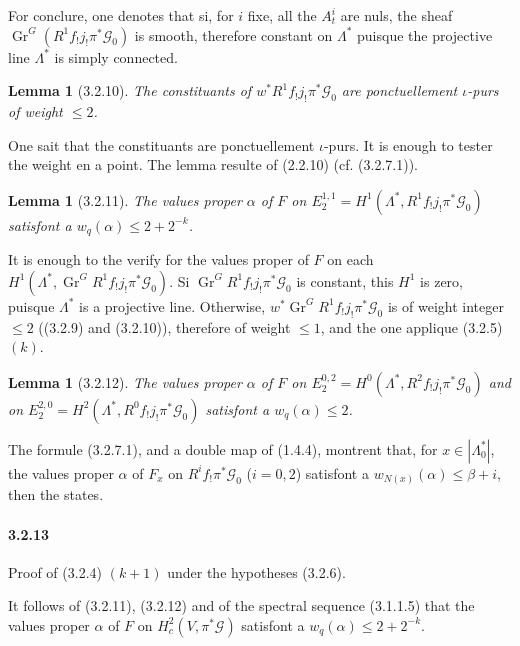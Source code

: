 \documentclass[12pt,a4paper]{article}
\theoremstyle{plain}
\newtheorem{lemma}[theorem]{Lemma}
\theoremstyle{definition}
\theoremstyle{remark}
\DeclareMathOperator{\Gr}{Gr}
\begin{document}
For conclure, one denotes that si, for $i$ fixe, all the $A_t^i$ are nuls, the sheaf $\Gr^G(R^1 f_! j_! \pi^* \mathscr{G}_0)$ is smooth, therefore constant on $\Lambda^*$ puisque the projective line $\Lambda^*$ is simply connected.

\begin{lemma}[3.2.10]
The constituants of $w^* R^1 f_! j_! \pi^* \mathscr{G}_0$ are ponctuellement $\iota$-purs of weight $\leq 2$.
\end{lemma}

One sait that the constituants are ponctuellement $\iota$-purs. It is enough to tester the weight en a point. The lemma resulte of (2.2.10) (cf. (3.2.7.1)).

\begin{lemma}[3.2.11]
The values proper $\alpha$ of $F$ on $E_2^{1,1} = H^1(\Lambda^*, R^1 f_! j_! \pi^* \mathscr{G}_0)$ satisfont a $w_q(\alpha) \leq 2 + 2^{-k}$.
\end{lemma}

It is enough to the verify for the values proper of $F$ on each $H^1(\Lambda^*, \Gr^G R^1 f_! j_! \pi^* \mathscr{G}_0)$. Si $\Gr^G R^1 f_! j_! \pi^* \mathscr{G}_0$ is constant, this $H^1$ is zero, puisque $\Lambda^*$ is a projective line. Otherwise, $w^* \Gr^G R^1 f_! j_! \pi^* \mathscr{G}_0$ is of weight integer $\leq 2$ ((3.2.9) and (3.2.10)), therefore of weight $\leq 1$, and the one applique (3.2.5) $(k)$.

\begin{lemma}[3.2.12]
The values proper $\alpha$ of $F$ on $E_2^{0,2} = H^0(\Lambda^*, R^2 f_! j_! \pi^* \mathscr{G}_0)$ and on $E_2^{2,0} = H^2(\Lambda^*, R^0 f_! j_! \pi^* \mathscr{G}_0)$ satisfont a $w_q(\alpha) \leq 2$.
\end{lemma}

The formule (3.2.7.1), and a double map of (1.4.4), montrent that, for $x \in |\Lambda_0^*|$, the values proper $\alpha$ of $F_x$ on $R^i f_! \pi^* \mathscr{G}_0$ ($i = 0, 2$) satisfont a $w_{N(x)}(\alpha) \leq \beta + i$, then the states.

\paragraph{3.2.13}
Proof of (3.2.4) $(k+1)$ under the hypotheses (3.2.6).


It follows of (3.2.11), (3.2.12) and of the spectral sequence (3.1.1.5) that the values proper $\alpha$ of $F$ on $H_c^2(V, \pi^*\mathscr{G})$ satisfont a $w_q(\alpha) \leq 2 + 2^{-k}$.
\end{document}
